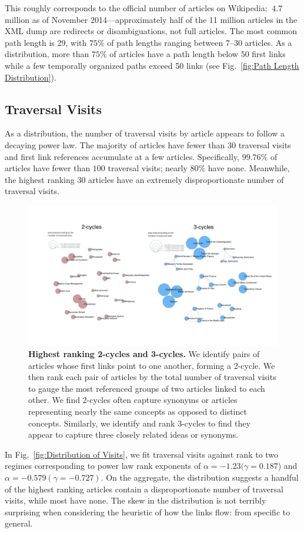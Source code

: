 \documentclass[pre,twocolumn,twoside,byrevtex,superscriptaddress,floatfix]{revtex4-1}
\begin{document}
This roughly corresponds to the official number of articles on Wikipedia: 
$~4.7$ million as of November 2014---approximately half of the 11 million 
articles in the XML dump are redirects or disambiguations, not full articles.
The most common path length is 29, with $75\%$ of path lengths ranging between 7--30 articles.
As a distribution, more than $75\%$ of articles have a path length below 
$50$ first links 
while a few temporally organized paths exceed 50 links 
(see Fig.~\ref{fig:Path Length Distribution}). 

\subsection{Traversal Visits}

As a distribution, the number of traversal visits by article appears to follow a decaying power law. 
The majority of articles have fewer than 30 traversal visits and
first link references accumulate at a few articles.
Specifically, $99.76\%$ of articles have fewer than $100$ traversal visits; nearly $80\%$ have none. 
Meanwhile, the highest ranking 30 articles have an extremely disproportionate number of traversal visits.

\begin{figure}[tph!]
  \includegraphics[width=\textwidth]{../graphics/2_and_3_cycles.pdf}
  \caption{
    \textbf{Highest ranking 2-cycles and 3-cycles.}
We identify pairs of articles whose first links point to one another, forming
a 2-cycle. We then rank each pair of articles by the total number of 
traversal visits to gauge the most referenced groups of two articles linked
to each other. We find 2-cycles often capture synonyms or articles representing nearly the 
same concepts as opposed to distinct concepts. Similarly, we identify and 
rank 3-cycles to find they appear to capture three closely related ideas or synonyms.}
  \label{fig:cycles}
\end{figure}
In Fig.~\ref{fig:Distribution of Visits}, we fit traversal visits against rank
to two regimes corresponding to power law rank exponents of 
$\alpha = -1.23 (\gamma = 0.187$) and $\alpha = -0.579 (\gamma = -0.727)$.
On the aggregate, the distribution suggests
a handful of the highest ranking articles contain a disproportionate number of traversal visits, while most have none. The skew in the distribution is not terribly surprising when considering the heuristic of how the links flow: from specific to general. 
\end{document}

